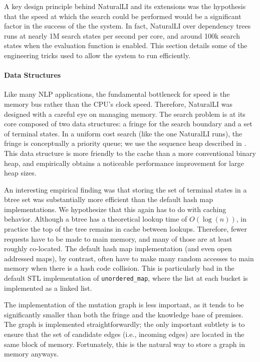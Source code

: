 A key design principle behind NaturalLI and its extensions was the hypothesis
  that the speed at which the search could be performed would be a significant
  factor in the success of the the system.
In fact, NaturalLI over dependency trees runs at nearly 1M search states per
  second per core, and around 100k search states when the evaluation function is enabled.
This section details some of the engineering tricks used to allow the system
  to run efficiently.

\paragraph{Data Structures}
Like many NLP applications, the fundamental bottleneck for speed is the memory bus
  rather than the CPU's clock speed.
Therefore, NaturalLI was designed with a careful eye on managing memory.
The search problem is at its core composed of two data structures: a fringe
  for the search boundary and a set of terminal states.
In a uniform cost search (like the one NaturalLI runs), the fringe is conceptually a
  priority queue; we use the sequence heap described in
  .
This data structure is more friendly to the cache than a more conventional binary heap,
  and empirically obtains a noticeable performance improvement for large heap sizes.

An interesting empirical finding was that storing the set of terminal states in a btree
  set was substantially more efficient than the default hash map implementations.
We hypothesize that this again has to do with caching behavior.
Although a btree has a theoretical lookup time of $O(\log(n))$, in practice the top
  of the tree remains in cache between lookups.
Therefore, fewer requests have to be made to main memory, and many of those are at least
  roughly co-located.
The default hash map implementation (and even open addressed maps), by contrast,
   often have to make many random accesses to main memory when there is a hash code
   collision.
This is particularly bad in the default STL implementation of \texttt{unordered\_map},
  where the list at each bucket is implemented as a linked list.

The implementation of the mutation graph is less important, as it tends to be
  significantly smaller than both the fringe and the knowledge base of premises.
The graph is implemented straightforwardly; the only important subtlety is to ensure
  that the set of candidate edges (i.e., incoming edges) are located in the same block
  of memory.
Fortunately, this is the natural way to store a graph in memory anyways.




